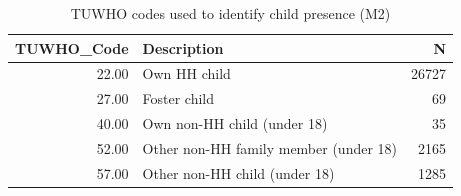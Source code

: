 \begin{table}[ht]
\centering
\begin{tabular}{rlr}
  \toprule
TUWHO\_Code & Description & N \\ 
  \midrule
22.00 & Own HH child & 26727 \\ 
  27.00 & Foster child &  69 \\ 
  40.00 & Own non-HH child (under 18) &  35 \\ 
  52.00 & Other non-HH family member (under 18) & 2165 \\ 
  57.00 & Other non-HH child (under 18) & 1285 \\ 
   \bottomrule
\end{tabular}
\caption{TUWHO codes used to identify child presence (M2)} 
\label{tab:m2_codes}
\end{table}
